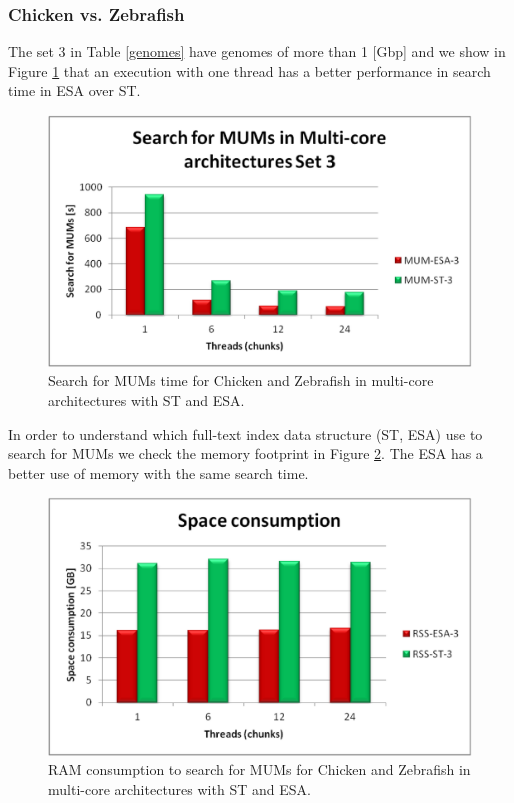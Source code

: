 \documentclass[runningheads,a4paper]{llncs}
\begin{document}
\subsubsection{Chicken vs. Zebrafish}
The set 3 in Table \ref{genomes} have genomes of more than 1 [Gbp] and we show in Figure \ref{fig:chicken-mum} that an execution with one thread has a better performance in search time in ESA over ST. 
 \begin{figure}[H]
  \centering
  \includegraphics[scale=0.3]{chicken-MUM.eps}
  \caption{Search for MUMs time for Chicken and Zebrafish in multi-core architectures with ST and ESA.}
  \label{fig:chicken-mum}
\end{figure}  
In order to understand which full-text index data structure (ST, ESA) use to search for MUMs we check the memory footprint in Figure \ref{fig:chicken-ram}. The ESA has a better use of memory with the same search time.
 \begin{figure}[H]
  \centering
  \includegraphics[scale=0.3]{chicken-RAM.eps}
  \caption{RAM consumption to search for MUMs for Chicken and Zebrafish in multi-core architectures with ST and ESA.}
  \label{fig:chicken-ram}
\end{figure}  
\end{document}
